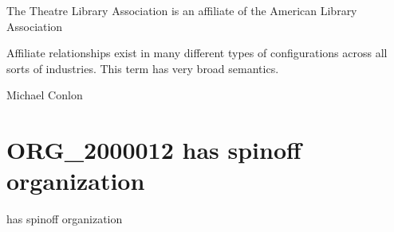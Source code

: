 \documentclass[letterpaper,10pt,english]{sphinxmanual}
\begin{document}
\begin{sphinxShadowBox}

\sphinxAtStartPar
The Theatre Library Association is an affiliate of the American Library Association
\end{sphinxShadowBox}

\begin{sphinxShadowBox}

\sphinxAtStartPar
Affiliate relationships exist in many different types of configurations across all sorts of industries.  This term has very broad semantics.
\end{sphinxShadowBox}

\begin{sphinxShadowBox}

\sphinxAtStartPar
{}
\end{sphinxShadowBox}

\begin{sphinxShadowBox}

\sphinxAtStartPar
Michael Conlon 
\end{sphinxShadowBox}
\begin{quote}
\label{\detokenize{doc-ORG_2000012:org-2000012}}\label{\detokenize{doc-ORG_2000012:has-spin-off-organization}}\label{\detokenize{doc-ORG_2000012:org-2000012}}
\ignorespaces \end{quote}


\section{ORG\_2000012 \sphinxhyphen{} has spin\sphinxhyphen{}off organization}
\label{\detokenize{doc-ORG_2000012:org-2000012-has-spin-off-organization}}\label{\detokenize{doc-ORG_2000012:index-0}}\label{\detokenize{doc-ORG_2000012::doc}}
\begin{sphinxShadowBox}

\sphinxAtStartPar
has spin\sphinxhyphen{}off organization
\end{sphinxShadowBox}
\end{document}
